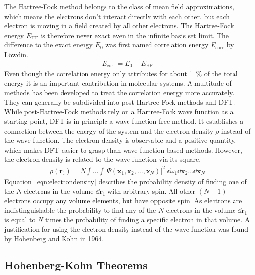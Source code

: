The Hartree-Fock method belongs to the class of mean field approximations,
which means the electrons don't interact directly with each other, but each
electron is moving in a field created by all other electrons. The Hartree-Fock
energy $E_\text{HF}$ is therefore never exact even in the infinite basis set
limit. The difference to the exact energy $E_0$ was first named correlation
energy $E_\text{corr}$ by L\"owdin\autocite{Lowdin_CorrelationProblemManyElectron_1958}.
%
\begin{align}
    E_\text{corr} = E_0 - E_\text{HF}
\end{align}
%
Even though the correlation energy only attributes for about \SI{1}{\percent}
of the total energy it is an important contribution in molecular systems. A
multitude of methods has been developed to treat the correlation energy more
accurately. They can generally be subdivided into post-Hartree-Fock methods and
\ac{DFT}. While post-Hartree-Fock methods rely on a Hartree-Fock wave function
as a starting point, \ac{DFT} is in principle a wave function free method. It
establishes a connection between the energy of the system and the electron
density $\rho$ instead of the wave function. The electron density is observable
and a positive quantity, which makes \ac{DFT} easier to grasp than wave
function based methods. However, the electron density is related to the wave
function via its square. 
%
\begin{align}
    \rho(\mathbf{r}_1)=N\int\dots\int|\Psi(\mathbf{x}_1,\mathbf{x}_2,\dots,\mathbf{x}_N)|^2\;\dd\omega_1\dd\mathbf{x}_2\dots\dd\mathbf{x}_N\label{eqn:electrondensity}
\end{align}
%
Equation~\eqref{eqn:electrondensity} describes the probability density of
finding one of the $N$ electrons in the volume $\dd \mathbf{r}_1$ with
arbitrary spin. All other $(N-1)$ electrons occupy any volume elements, but
have opposite spin. As electrons are indistinguishable the probability to find
any of the $N$ electrons in the volume $\dd\mathbf{r}_1$ is equal to $N$ times
the probability of finding a specific electron in that volume.  A justification
for using the electron density instead of the wave function was found by
Hohenberg and Kohn in 1964.

\subsection{Hohenberg-Kohn Theorems}
\label{sec:HKtheorems}

